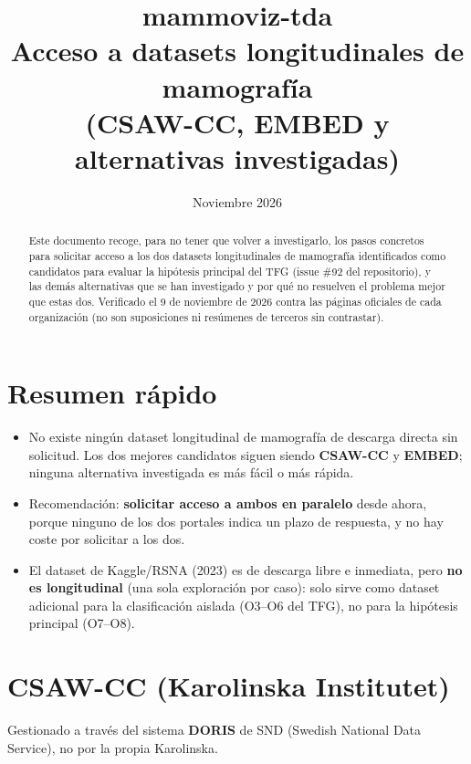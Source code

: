 \documentclass[11pt,a4paper]{article}
\title{\textbf{mammoviz-tda}\\[4pt]\large Acceso a datasets longitudinales de mamografía\\[2pt]\normalsize (CSAW-CC, EMBED y alternativas investigadas)}
\author{}
\date{Noviembre 2026}
\begin{document}
\maketitle
\thispagestyle{empty}

\begin{abstract}
\noindent Este documento recoge, para no tener que volver a investigarlo,
los pasos concretos para solicitar acceso a los dos datasets longitudinales
de mamografía identificados como candidatos para evaluar la hipótesis
principal del TFG (issue \#92 del repositorio), y las demás alternativas
que se han investigado y por qué no resuelven el problema mejor que estas
dos. Verificado el 9 de noviembre de 2026 contra las páginas oficiales de
cada organización (no son suposiciones ni resúmenes de terceros sin
contrastar).
\end{abstract}

\section{Resumen rápido}
\begin{itemize}
  \item No existe ningún dataset longitudinal de mamografía de descarga
        directa sin solicitud. Los dos mejores candidatos siguen siendo
        \textbf{CSAW-CC} y \textbf{EMBED}; ninguna alternativa investigada
        es más fácil o más rápida.
  \item Recomendación: \textbf{solicitar acceso a ambos en paralelo} desde
        ahora, porque ninguno de los dos portales indica un plazo de
        respuesta, y no hay coste por solicitar a los dos.
  \item El dataset de Kaggle/RSNA (2023) es de descarga libre e inmediata,
        pero \textbf{no es longitudinal} (una sola exploración por caso):
        solo sirve como dataset adicional para la clasificación aislada
        (O3--O6 del TFG), no para la hipótesis principal (O7--O8).
\end{itemize}

\section{CSAW-CC (Karolinska Institutet)}
\label{sec:csawcc}
Gestionado a través del sistema \textbf{DORIS} de SND (Swedish National
Data Service), no por la propia Karolinska.
\end{document}

